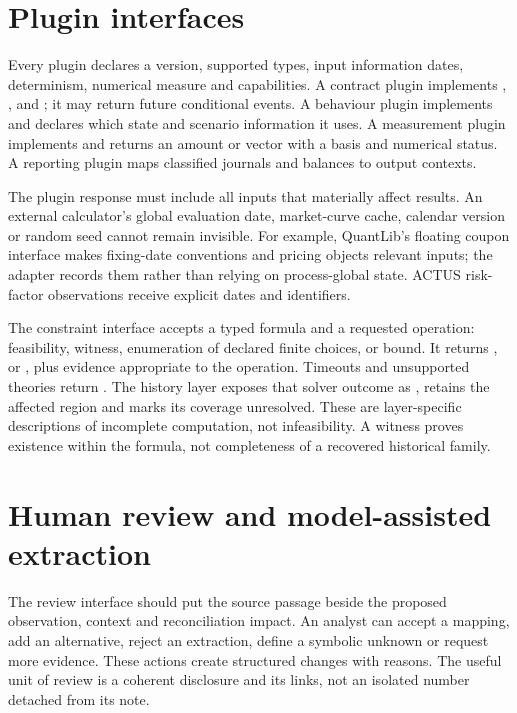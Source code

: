 

\section{Plugin interfaces}

Every plugin declares a version, supported types, input information dates,
determinism, numerical measure and capabilities. A contract plugin implements
, ,  and ; it may
return future conditional events. A behaviour plugin implements
 and declares which state and scenario information it uses.
A measurement plugin implements  and returns an amount or
vector with a basis and numerical status. A reporting plugin maps classified
journals and balances to output contexts.

The plugin response must include all inputs that materially affect results.
An external calculator's global evaluation date, market-curve cache, calendar
version or random seed cannot remain invisible. For example, QuantLib's
floating coupon interface makes fixing-date conventions and pricing objects
relevant inputs; the adapter records them rather than relying on process-global
state. ACTUS risk-factor observations receive explicit dates and identifiers.

The constraint interface accepts a typed formula and a requested operation:
feasibility, witness, enumeration of declared finite choices, or bound. It
returns ,  or , plus evidence appropriate
to the operation. Timeouts and unsupported theories return .
The history layer exposes that solver outcome as ,
retains the affected region and marks its coverage unresolved. These are
layer-specific descriptions of incomplete computation, not infeasibility.
A witness proves existence within the formula, not completeness of a recovered
historical family.

\section{Human review and model-assisted extraction}

The review interface should put the source passage beside the proposed
observation, context and reconciliation impact. An analyst can accept a
mapping, add an alternative, reject an extraction, define a symbolic unknown
or request more evidence. These actions create structured changes with
reasons. The useful unit of review is a coherent disclosure and its links,
not an isolated number detached from its note.

